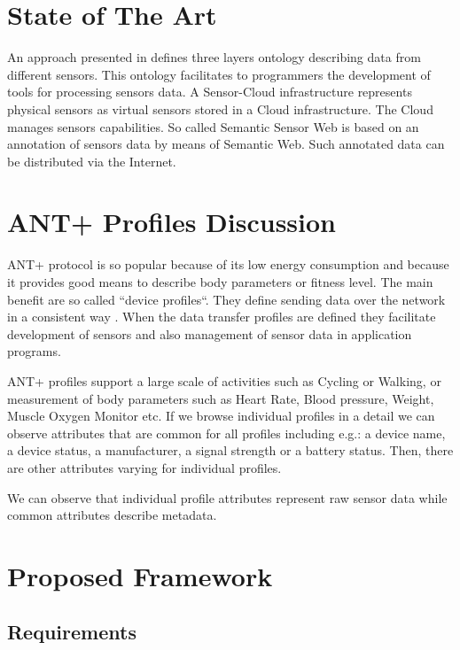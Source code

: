 \documentclass[conference]{IEEEconf}
\begin{document}
\section{State of The Art}\label{sec:state-of-the-art}

An approach presented in \cite{mehmood2014ontology} defines three layers ontology describing data from different sensors. This ontology facilitates to programmers the development of tools for processing sensors data. A Sensor-Cloud infrastructure \cite{5635688} represents physical sensors as virtual sensors stored in a Cloud infrastructure. The Cloud manages sensors capabilities. So called Semantic Sensor Web \cite{4557983} is based on an annotation of sensors data by means of Semantic Web. Such annotated data can be distributed via the Internet.


\section{ANT+ Profiles Discussion}\label{sec:ant-plus-profiles}
ANT+ protocol is so popular because of its low energy consumption and because it provides good means to describe body parameters or fitness level. The main benefit are so called ``device profiles``.  They define sending data over the network in a consistent way \cite{innovations2013ant}. When the data transfer profiles are defined they facilitate development of sensors and also management of sensor data in application programs.

ANT+ profiles support a large scale of activities such as Cycling or Walking, or measurement of body parameters such as Heart Rate, Blood pressure, Weight, Muscle Oxygen Monitor etc. If we browse individual profiles in a detail we can observe attributes that are common for all profiles including e.g.: a device name, a device status, a manufacturer, a signal strength or a battery status. Then, there are other attributes varying for individual profiles. 

We can observe that individual profile attributes represent raw sensor data while common attributes describe metadata. 

\section{Proposed Framework}\label{sec:framework}

\subsection{Requirements}\label{sec:requirements}
\end{document}
